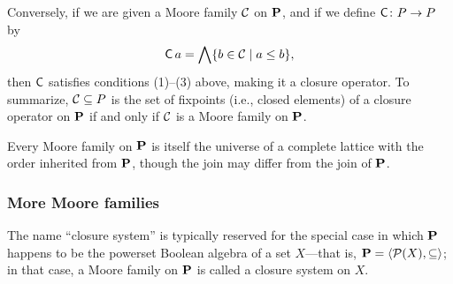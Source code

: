 Conversely, if we are given a Moore family $\mathcal{C}$ on $\mathbf{P}$, and if we define 
$\operatorname{\mathsf{C}} \colon P \to P$ by
\[
\operatorname{\mathsf{C}} a = \bigwedge \{b \in \mathcal{C} \mid a\leq b\},
\]
then $\operatorname{\mathsf{C}}$ satisfies conditions (1)--(3)
above, making it a closure operator.
To summarize, $\mathcal{C} \subseteq P$ is the set of fixpoints (i.e., closed elements)
of a closure operator on
$\mathbf{P}$ if and only if $\mathcal{C}$ is a Moore family on $\mathbf{P}$.

Every Moore family on $\mathbf{P}$ is itself the universe of a complete lattice with the order inherited
from $\mathbf{P}$, though the join may differ from the join of $\mathbf{P}$.

\subsubsection{More Moore families}
The name ``closure system'' is typically reserved for the special case
in which $\mathbf{P}$ happens to be the powerset Boolean
algebra of a set $X$---that is, $\mathbf{P} = \langle\mathcal{P}(X), \subseteq\rangle$; in that case, a Moore family on $\mathbf{P}$ 
is called a closure system on $X$. 


